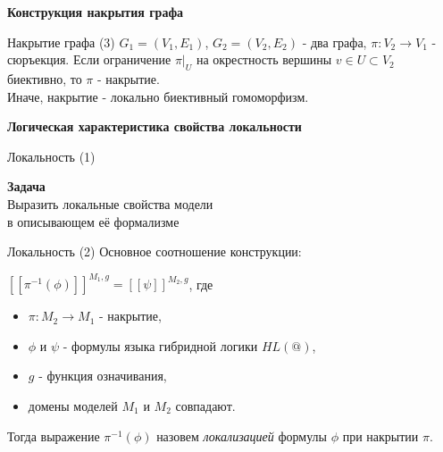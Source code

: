 \documentclass{beamer}
\begin{document}
\begin{frame}{}
\begin{center}
	\textbf{Конструкция накрытия графа}
\end{center}
\end{frame}

\begin{frame}{Накрытие графа (3)}
$G_1 = (V_1, E_1)$, $G_2 = (V_2, E_2)$ - два графа, $\pi: V_2 \to V_1$ - сюръекция. Если ограничение $\pi \vert_U$ на окрестность вершины $v \in U \subset V_2$ биективно, то $\pi$ - накрытие.\\
\bigskip
Иначе, накрытие - локально биективный гомоморфизм.
\end{frame}


\begin{frame}{}
\begin{center}
	\textbf{Логическая характеристика свойства локальности}
\end{center}
\end{frame}

\begin{frame}{Локальность (1)}
\begin{center}
\textbf{Задача}\\
\bigskip
Выразить локальные свойства модели \\в описывающем её формализме
\end{center}
\end{frame}

\begin{frame}{Локальность (2)}
Основное соотношение конструкции:\\
\bigskip
\begin{center}
$[ \! [ \pi^{-1}(\phi) ] \! ]^{M_1, g} = [ \! [ \psi ] \! ]^{M_2, g}$, где
\end{center}
\bigskip
\begin{itemize}
	\item $\pi : M_2 \to M_1$ - накрытие,
	\item $\phi$ и $\psi$ - формулы языка гибридной логики $HL(@)$,
	\item $g$ - функция означивания,
	\item домены моделей $M_1$ и $M_2$ совпадают.
\end{itemize}
\bigskip
Тогда выражение $\pi^{-1}(\phi)$ назовем \textit{локализацией} формулы $\phi$ при накрытии $\pi$.
\end{frame}
\end{document}
